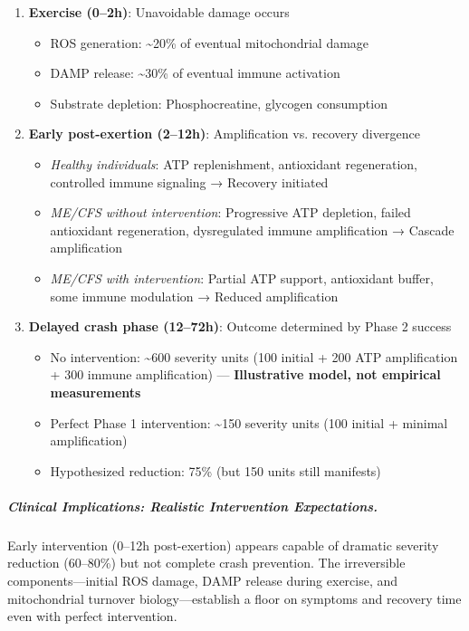 \begin{enumerate}
    \item \textbf{Exercise (0--2h)}: Unavoidable damage occurs
    \begin{itemize}
        \item ROS generation: \textasciitilde20\% of eventual mitochondrial damage
        \item DAMP release: \textasciitilde30\% of eventual immune activation
        \item Substrate depletion: Phosphocreatine, glycogen consumption
    \end{itemize}

    \item \textbf{Early post-exertion (2--12h)}: Amplification vs. recovery divergence
    \begin{itemize}
        \item \textit{Healthy individuals}: ATP replenishment, antioxidant regeneration, controlled immune signaling → Recovery initiated
        \item \textit{ME/CFS without intervention}: Progressive ATP depletion, failed antioxidant regeneration, dysregulated immune amplification → Cascade amplification
        \item \textit{ME/CFS with intervention}: Partial ATP support, antioxidant buffer, some immune modulation → Reduced amplification
    \end{itemize}

    \item \textbf{Delayed crash phase (12--72h)}: Outcome determined by Phase 2 success
    \begin{itemize}
        \item No intervention: \textasciitilde600 severity units (100 initial + 200 ATP amplification + 300 immune amplification) --- \textbf{Illustrative model, not empirical measurements}
        \item Perfect Phase 1 intervention: \textasciitilde150 severity units (100 initial + minimal amplification)
        \item Hypothesized reduction: 75\% (but 150 units still manifests)
    \end{itemize}
\end{enumerate}

\subparagraph{Clinical Implications: Realistic Intervention Expectations.}

Early intervention (0--12h post-exertion) appears capable of dramatic severity reduction (60--80\%) but not complete crash prevention. The irreversible components---initial ROS damage, DAMP release during exercise, and mitochondrial turnover biology---establish a floor on symptoms and recovery time even with perfect intervention.

